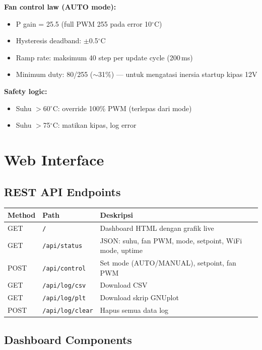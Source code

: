 \documentclass[11pt,a4paper]{article}
\begin{document}
\textbf{Fan control law (AUTO mode):}
\begin{itemize}
    \item P gain = 25.5 (full PWM 255 pada error 10$^{\circ}$C)
    \item Hysteresis deadband: $\pm$0.5$^{\circ}$C
    \item Ramp rate: maksimum 40 step per update cycle (200\,ms)
    \item Minimum duty: 80/255 ($\sim$31\%) --- untuk mengatasi inersia startup kipas 12V
\end{itemize}

\textbf{Safety logic:}
\begin{itemize}
    \item Suhu $>$60$^{\circ}$C: override 100\% PWM (terlepas dari mode)
    \item Suhu $>$75$^{\circ}$C: matikan kipas, log error
\end{itemize}

\section{Web Interface}

\subsection{REST API Endpoints}

\begin{center}
\begin{tabular}{|l|l|l|}
\hline
\rowcolor{lightgray}
\textbf{Method} & \textbf{Path} & \textbf{Deskripsi} \\
\hline
GET & \texttt{/} & Dashboard HTML dengan grafik live \\
GET & \texttt{/api/status} & JSON: suhu, fan PWM, mode, setpoint, WiFi mode, uptime \\
POST & \texttt{/api/control} & Set mode (AUTO/MANUAL), setpoint, fan PWM \\
GET & \texttt{/api/log/csv} & Download CSV \\
GET & \texttt{/api/log/plt} & Download skrip GNUplot \\
POST & \texttt{/api/log/clear} & Hapus semua data log \\
\hline
\end{tabular}
\end{center}

\subsection{Dashboard Components}
\end{document}
